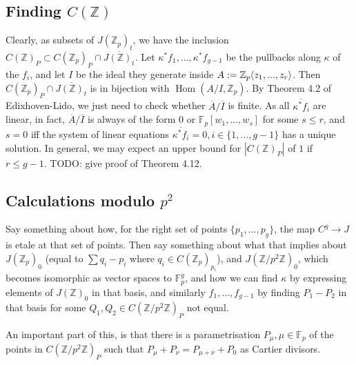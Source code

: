 \documentclass{article}
\newcommand{\Z}{\mathbb{Z}}
\newcommand{\F}{\mathbb{F}}
\renewcommand{\angle}[1]{\hspace{-2pt}\left\langle #1 \right\rangle}
\DeclareMathOperator{\Hom}{Hom}
\theoremstyle{plain}
\theoremstyle{definition}
\theoremstyle{remark}
\begin{document}
\subsection{Finding \texorpdfstring{$C(\Z)$}{C(Z)}}
Clearly, as subsets of $J(\Z_p)_t$, we have the inclusion $C(\Z)_P \subset C(\Z_p)_P \cap \overline{J(\Z)_t}$. Let $\kappa^*f_1,...,\kappa^*f_{g-1}$ be the pullbacks along $\kappa$ of the $f_i$, and let $I$ be the ideal they generate inside $A := \Z_p\angle{z_1,...,z_r}$. Then $C(\Z_p)_P \cap \overline{J(\Z)_t}$ is in bijection with $\Hom(A/I,\Z_p)$. By Theorem 4.2 of Edixhoven-Lido, we just need to check whether $\overline{A}/\overline{I}$ is finite. As all $\overline{\kappa^* f_i}$ are linear, in fact, $\overline{A}/\overline{I}$ is always of the form $0$ or $\F_p[w_1,...,w_s]$ for some $s \leq r$, and $s = 0$ iff the system of linear equations $\overline{\kappa^* f_i} = 0, i \in \{1,...,g-1\}$ has a unique solution. In general, we may expect an upper bound for $|C(\Z)_P|$ of $1$ if $r \leq g-1$.
TODO: give proof of Theorem 4.12.

\subsection{Calculations modulo \texorpdfstring{$p^2$}{p\^2}}
Say something about how, for the right set of points $\{p_1,...,p_g\}$, the map $C^{g} \to J$ is etale at that set of points. Then say something about what that implies about $J(\Z_p)_0$ (equal to $\sum q_i - p_i$ where $q_i \in C(\Z_p)_{p_i}$), and $J(\Z/p^2\Z)_0$, which becomes isomorphic as vector spaces to $\F_p^g$, and how we can find $\kappa$ by expressing elements of $J(\Z)_0$ in that basis, and similarly $f_1,...,f_{g-1}$ by finding $P_1 - P_2$ in that basis for some $Q_1,Q_2 \in C(\Z/p^2\Z)_P$ not equal.

An important part of this, is that there is a parametrisation $P_\mu, \mu \in \F_p$ of the points in $C(\Z/p^2\Z)_P$ such that $P_\mu + P_\nu = P_{\mu + \nu} + P_0$ as Cartier divisors.
\end{document}
